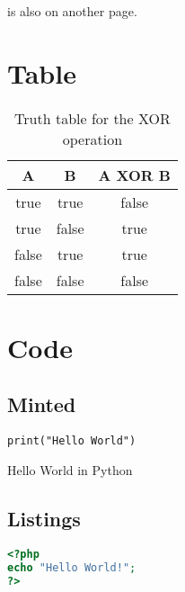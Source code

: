  is also on another page.

\section{Table}
\label{sec:table}

\begin{table}[H]
    \centering
    \begin{tabular}{| c | c | c |}
        \hline
        A & B & A XOR B \\
        \hline\hline
        true  & true  & false \\
        true  & false & true  \\
        false & true  & true  \\
        false & false & false \\
        \hline
    \end{tabular}
    \caption{Truth table for the XOR operation}
    \label{tab:xor_truth_table}
\end{table}

\section{Code}
\label{sec:code}

\subsection{Minted}
\label{subsec:minted}

\begin{listing}[H]
    \begin{verbatim}
print("Hello World")
    \end{verbatim}
    \caption{Hello World in Python}
    \label{lst:python_hello_world}
\end{listing}

\subsection{Listings}
\label{subsec:listings}

\begin{lstlisting}[language=PHP,caption=Hello World in PHP,label=lst:php_hello_world]
<?php
echo "Hello World!";
?>
\end{lstlisting}